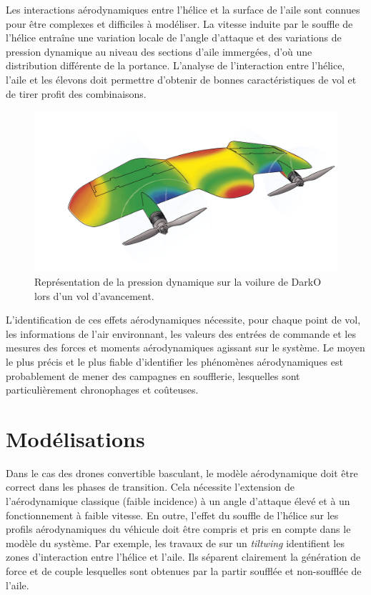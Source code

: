     Les interactions aérodynamiques entre l'hélice et la surface de l'aile sont connues pour être complexes et difficiles à modéliser. La vitesse induite par le souffle de l'hélice entraîne une variation locale de l'angle d'attaque et des variations de pression dynamique au niveau des sections d'aile immergées, d'où une distribution différente de la portance. L'analyse de l'interaction entre l'hélice, l'aile et les élevons doit permettre d'obtenir de bonnes caractéristiques de vol et de tirer profit des combinaisons.

    \begin{figure}[ht!]
        \centering
            \includegraphics[width=0.6\columnwidth]{figures/Darko-air-pressure.png}
            \caption{Représentation de la pression dynamique sur la voilure de DarkO lors d'un vol d'avancement.}
            \label{fig:darkoAirPress}
    \end{figure}

     L'identification de ces effets aérodynamiques nécessite, pour chaque point de vol, les informations de l'air environnant, les valeurs des entrées de commande et les mesures des forces et moments aérodynamiques agissant sur le système. Le moyen le plus précis et le plus fiable d'identifier les phénomènes aérodynamiques est probablement de mener des campagnes en soufflerie, lesquelles sont particulièrement chronophages et coûteuses.


\section{Modélisations}
Dans le cas des drones convertible basculant, le modèle aérodynamique doit être correct dans les phases de transition. Cela nécessite l'extension de l'aérodynamique classique (faible incidence) à un angle d'attaque élevé et à un fonctionnement à faible vitesse. En outre, l'effet du souffle de l'hélice sur les profils aérodynamiques du véhicule doit être compris et pris en compte dans le modèle du système. Par exemple, les travaux de \cite{9444145} sur un \textit{tiltwing} identifient les zones d'interaction entre l'hélice et l'aile. Ils séparent clairement la génération de force et de couple lesquelles sont obtenues par la partir soufflée et non-soufflée de l'aile.


